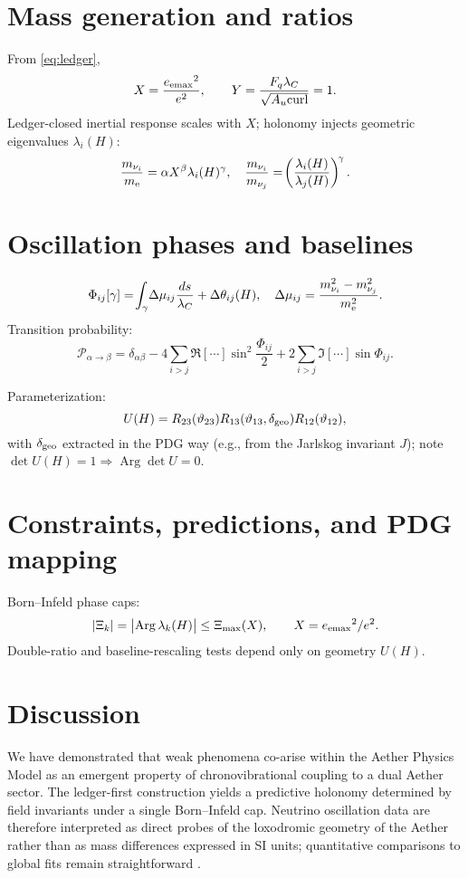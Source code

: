 \documentclass[coverpage]{qadi-article}
\DeclareMathOperator{\Arg}{Arg} %
\begin{document}
\section{Mass generation and ratios}
From \eqref{eq:ledger},
\[
X=\frac{{e_{\mathrm{emax}}}^{2}}{e^{2}},\qquad
Y=\frac{F_q\lambda_C}{\sqrt{A_u\mathrm{curl}}}=1.
\]
Ledger-closed inertial response scales with \(X\); holonomy injects geometric eigenvalues \(\lambda_i(H)\):
\begin{equation}
\frac{m_{\nu_i}}{m_{\mathrm e}}=\alpha X^{\beta}\lambda_i(H)^{\gamma},
\quad
\frac{m_{\nu_i}}{m_{\nu_j}}=\!\left(\frac{\lambda_i(H)}{\lambda_j(H)}\right)^{\!\gamma}.
\label{eq:ratio}
\end{equation}

\section{Oscillation phases and baselines}
\[
\Phi_{ij}[\gamma]=\!\int_\gamma\!\Delta\mu_{ij}\frac{ds}{\lambda_C}+\Delta\theta_{ij}(H),
\quad
\Delta\mu_{ij}=\frac{m_{\nu_i}^2-m_{\nu_j}^2}{m_{\mathrm e}^2}.
\]
Transition probability:
\[
\mathcal P_{\alpha\to\beta}=\delta_{\alpha\beta}
-4\!\sum_{i>j}\!\Re[\cdots]\sin^2\!\frac{\Phi_{ij}}{2}
+2\!\sum_{i>j}\!\Im[\cdots]\sin\Phi_{ij}.
\]

Parameterization:
\[
U(H)=R_{23}(\vartheta_{23})R_{13}(\vartheta_{13},\delta_{\rm geo})R_{12}(\vartheta_{12}),
\]
with \(\delta_{\rm geo}\) extracted in the PDG way (e.g., from the Jarlskog invariant \(J\)); note \(\det U(H)=1\Rightarrow \Arg\det U=0\).

\section{Constraints, predictions, and PDG mapping}
Born–Infeld phase caps:
\[
|\Xi_k|=\bigl|\Arg\lambda_k(H)\bigr|\le\Xi_{\max}(X),\qquad X=\eemaxsq/\eesq.
\]
Double-ratio and baseline-rescaling tests depend only on geometry \(U(H)\).

\section*{Discussion}
We have demonstrated that weak phenomena co-arise within the Aether Physics Model as an emergent property of chronovibrational coupling to a dual Aether sector.  
The ledger-first construction yields a predictive holonomy determined by field invariants under a single Born--Infeld cap.  
Neutrino oscillation data are therefore interpreted as direct probes of the loxodromic geometry of the Aether rather than as mass differences expressed in SI units; quantitative comparisons to global fits remain straightforward \cite{PDG2024Neutrino}.
\end{document}
